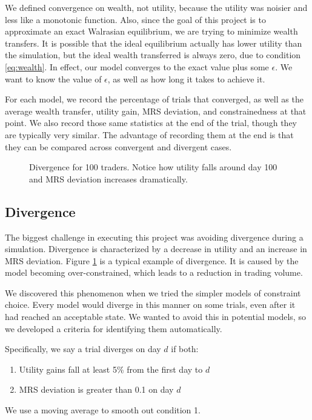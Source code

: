 \documentclass[12pt,a4paper,titlepage]{article}
\begin{document}
We defined convergence on wealth, not utility, because the utility was noisier and less like a monotonic function.
Also, since the goal of this project is to approximate an exact Walrasian equilibrium, we are trying to minimize wealth transfers.
It is possible that the ideal equilibrium actually has lower utility than the simulation, but the ideal wealth transferred is always zero, due to condition \ref{eq:wealth}.
In effect, our model converges to the exact value plus some $\epsilon$.
We want to know the value of $\epsilon$, as well as how long it takes to achieve it.

For each model, we record the percentage of trials that converged, as well as the average wealth transfer, utility gain, MRS deviation, and constrainedness at that point.
We also record those same statistics at the end of the trial, though they are typically very similar.
The advantage of recording them at the end is that they can be compared across convergent and divergent cases.

\begin{figure}[H]
    \centering
    
    \caption{
      Divergence for 100 traders.
      Notice how utility falls around day 100 and MRS deviation increases dramatically.
    }
    \label{fig:div}
\end{figure}

\subsection{Divergence}
The biggest challenge in executing this project was avoiding divergence during a simulation.
Divergence is characterized by a decrease in utility and an increase in MRS deviation.
Figure \ref{fig:div} is a typical example of divergence. 
It is caused by the model becoming over-constrained, which leads to a reduction in trading volume.

We discovered this phenomenon when we tried the simpler models of constraint choice.
Every model would diverge in this manner on some trials, even after it had reached an acceptable state.
We wanted to avoid this in potential models, so we developed a criteria for identifying them automatically.

Specifically, we say a trial diverges on day $d$ if both:
\begin{enumerate}
  \item Utility gains fall at least 5\% from the first day to $d$ 
  \item MRS deviation is greater than 0.1 on day $d$
\end{enumerate}
We use a moving average to smooth out condition 1.
    
\end{document}
